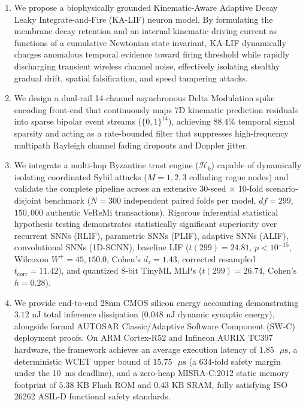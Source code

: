 \documentclass[journal]{IEEEtran}
\begin{document}
\begin{enumerate}
    \item We propose a biophysically grounded Kinematic-Aware Adaptive Decay Leaky Integrate-and-Fire (KA-LIF) neuron model. By formulating the membrane decay retention and an internal kinematic driving current as functions of a cumulative Newtonian state invariant, KA-LIF dynamically charges anomalous temporal evidence toward firing threshold while rapidly discharging transient wireless channel noise, effectively isolating stealthy gradual drift, spatial falsification, and speed tampering attacks.
    \item We design a dual-rail 14-channel asynchronous Delta Modulation spike encoding front-end that continuously maps 7D kinematic prediction residuals into sparse bipolar event streams ($\{0, 1\}^{14}$), achieving $88.4\%$ temporal signal sparsity and acting as a rate-bounded filter that suppresses high-frequency multipath Rayleigh channel fading dropouts and Doppler jitter.
    \item We integrate a multi-hop Byzantine trust engine ($\mathcal{H}_k$) capable of dynamically isolating coordinated Sybil attacks ($M=1, 2, 3$ colluding rogue nodes) and validate the complete pipeline across an extensive 30-seed $\times$ 10-fold scenario-disjoint benchmark ($N=300$ independent paired folds per model, $df=299$, $150{,}000$ authentic VeReMi transactions). Rigorous inferential statistical hypothesis testing demonstrates statistically significant superiority over recurrent SNNs (RLIF), parametric SNNs (PLIF), adaptive SNNs (ALIF), convolutional SNNs (1D-SCNN), baseline LIF ($t(299)=24.81$, $p<10^{-15}$, Wilcoxon $W^+=45{,}150.0$, Cohen's $d_z=1.43$, corrected resampled $t_{\text{corr}}=11.42$), and quantized 8-bit TinyML MLPs ($t(299)=26.74$, Cohen's $h=0.28$).
    \item We provide end-to-end 28nm CMOS silicon energy accounting demonstrating $3.12\text{ nJ}$ total inference dissipation ($0.048\text{ nJ}$ dynamic synaptic energy), alongside formal AUTOSAR Classic/Adaptive Software Component (SW-C) deployment proofs. On ARM Cortex-R52 and Infineon AURIX TC397 hardware, the framework achieves an average execution latency of $1.85\text{ }\mu\text{s}$, a deterministic WCET upper bound of $15.75\text{ }\mu\text{s}$ (a 634-fold safety margin under the 10~ms deadline), and a zero-heap MISRA-C:2012 static memory footprint of $5.38\text{ KB}$ Flash ROM and $0.43\text{ KB}$ SRAM, fully satisfying ISO 26262 ASIL-D functional safety standards.
\end{enumerate}
\end{document}
